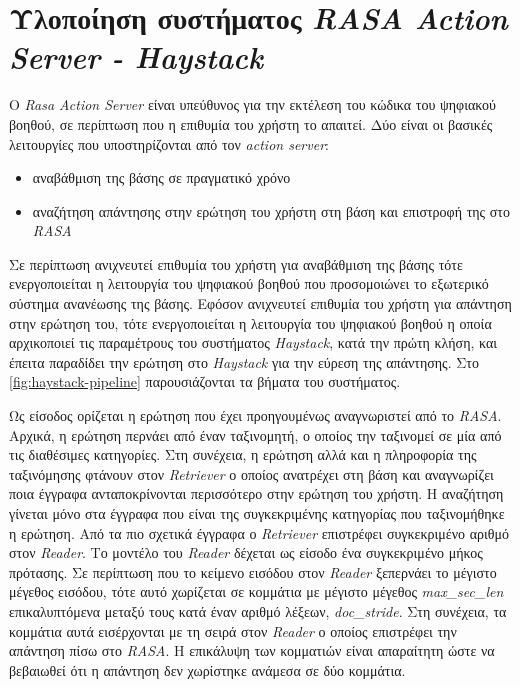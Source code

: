 \section{Υλοποίηση συστήματος \emph{RASA Action Server - Haystack}}
\label{sec:haystack_impl}
Ο \emph{Rasa Action Server} είναι υπεύθυνος για την εκτέλεση του κώδικα του ψηφιακού βοηθού, σε περίπτωση που η επιθυμία του χρήστη το απαιτεί. Δύο είναι οι βασικές λειτουργίες που υποστηρίζονται από τον \emph{action server}:
\begin{itemize}
    \item αναβάθμιση της βάσης σε πραγματικό χρόνο
    \item αναζήτηση απάντησης στην ερώτηση του χρήστη στη βάση και επιστροφή της στο \emph{RASA}
\end{itemize}

Σε περίπτωση ανιχνευτεί επιθυμία του χρήστη για αναβάθμιση της βάσης τότε ενεργοποιείται η λειτουργία  του ψηφιακού βοηθού που προσομοιώνει το εξωτερικό σύστημα ανανέωσης της βάσης. Εφόσον ανιχνευτεί επιθυμία του χρήστη για απάντηση στην ερώτηση του, τότε ενεργοποιείται η λειτουργία του ψηφιακού βοηθού η οποία αρχικοποιεί τις παραμέτρους του συστήματος \emph{Haystack}, κατά την πρώτη κλήση, και έπειτα παραδίδει την ερώτηση στο \emph{Haystack} για την εύρεση της απάντησης. Στο \autoref{fig:haystack-pipeline} παρουσιάζονται τα βήματα του συστήματος.

Ως είσοδος ορίζεται η ερώτηση που έχει προηγουμένως αναγνωριστεί από το \emph{RASA}. Αρχικά, η ερώτηση περνάει από έναν ταξινομητή, ο οποίος την ταξινομεί σε μία από τις διαθέσιμες κατηγορίες. Στη συνέχεια, η ερώτηση αλλά και η πληροφορία της ταξινόμησης φτάνουν στον \emph{Retriever} ο οποίος ανατρέχει στη βάση και αναγνωρίζει ποια έγγραφα ανταποκρίνονται περισσότερο στην ερώτηση του χρήστη. Η αναζήτηση γίνεται μόνο στα έγγραφα  που είναι της συγκεκριμένης κατηγορίας που ταξινομήθηκε η ερώτηση. Από τα πιο σχετικά έγγραφα ο \emph{Retriever} επιστρέφει συγκεκριμένο αριθμό στον \emph{Reader}. Το μοντέλο του \emph{Reader} δέχεται ως είσοδο ένα συγκεκριμένο μήκος πρότασης. Σε περίπτωση που το κείμενο εισόδου στον \emph{Reader} ξεπερνάει το μέγιστο μέγεθος εισόδου, τότε αυτό χωρίζεται σε κομμάτια με μέγιστο μέγεθος \emph{max\_sec\_len} επικαλυπτόμενα μεταξύ τους κατά έναν αριθμό λέξεων, \emph{doc\_stride}. Στη συνέχεια, τα κομμάτια αυτά εισέρχονται με τη σειρά στον \emph{Reader} ο οποίος επιστρέφει την απάντηση πίσω στο \emph{RASA}. Η επικάλυψη των κομματιών είναι απαραίτητη ώστε να βεβαιωθεί ότι η απάντηση δεν χωρίστηκε ανάμεσα σε δύο κομμάτια.


